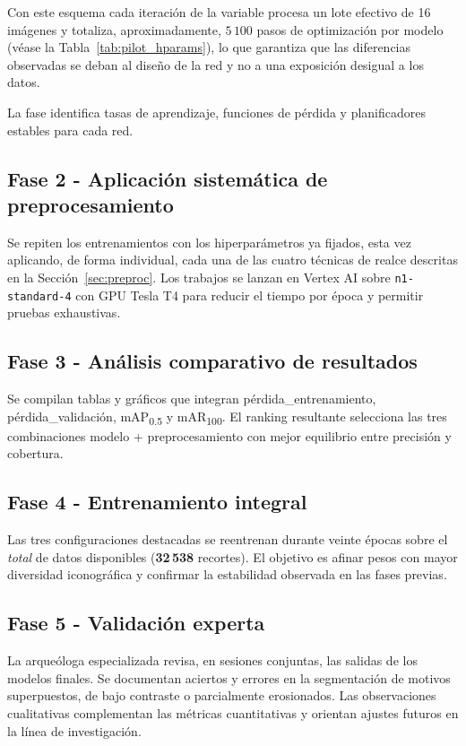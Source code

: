 Con este esquema cada iteración de la variable procesa un lote efectivo de 16 imágenes y totaliza, aproximadamente, \(5\,100\) pasos de optimización por modelo (véase la Tabla~\ref{tab:pilot_hparams}), lo que garantiza que las diferencias observadas se deban al diseño de la red y no a una exposición desigual a los datos.

La fase identifica tasas de aprendizaje, funciones de pérdida y planificadores estables para cada red.

\subsection*{Fase 2 - Aplicación sistemática de preprocesamiento}

Se repiten los entrenamientos con los hiperparámetros ya fijados, esta vez aplicando, de forma individual, cada una de las cuatro técnicas de realce descritas en la Sección~\ref{sec:preproc}.
Los trabajos se lanzan en Vertex AI sobre \texttt{n1-standard-4} con GPU Tesla T4 para reducir el tiempo por época y permitir pruebas exhaustivas.

\subsection*{Fase 3 - Análisis comparativo de resultados}

Se compilan tablas y gráficos que integran pérdida\_entrenamiento, pérdida\_validación, mAP\textsubscript{0.5} y mAR\textsubscript{100}.
El ranking resultante selecciona las tres combinaciones modelo + preprocesamiento con mejor equilibrio entre precisión y cobertura.

\subsection*{Fase 4 - Entrenamiento integral}

Las tres configuraciones destacadas se reentrenan durante veinte épocas sobre el \emph{total} de datos disponibles (\textbf{32\,538} recortes).
El objetivo es afinar pesos con mayor diversidad iconográfica y confirmar la estabilidad observada en las fases previas.

\subsection*{Fase 5 - Validación experta}

La arqueóloga especializada revisa, en sesiones conjuntas, las salidas de los modelos finales.
Se documentan aciertos y errores en la segmentación de motivos superpuestos, de bajo contraste o parcialmente erosionados.
Las observaciones cualitativas complementan las métricas cuantitativas y orientan ajustes futuros en la línea de investigación.

